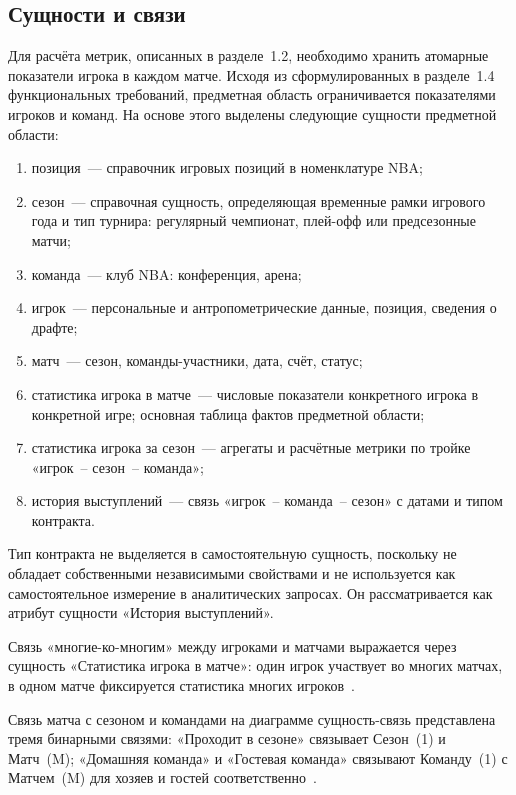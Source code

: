 \subsection{Сущности и связи}

Для расчёта метрик, описанных в разделе~1.2, необходимо хранить атомарные
показатели игрока в каждом матче. Исходя из сформулированных в разделе~1.4
функциональных требований, предметная область ограничивается
показателями игроков и команд. На основе этого выделены следующие сущности
предметной области:
\begin{enumerate}
    \item позиция~--- справочник игровых позиций в номенклатуре NBA;
    \item сезон~--- справочная сущность, определяющая временные рамки игрового
          года и тип турнира: регулярный чемпионат, плей-офф или предсезонные
          матчи;
    \item команда~--- клуб NBA: конференция, арена;
    \item игрок~--- персональные и антропометрические данные, позиция,
          сведения о драфте;
    \item матч~--- сезон, команды-участники, дата, счёт, статус;
    \item статистика игрока в матче~--- числовые показатели конкретного
          игрока в конкретной игре; основная таблица фактов предметной области;
    \item статистика игрока за сезон~--- агрегаты и расчётные метрики
          по тройке «игрок~-- сезон~-- команда»;
    \item история выступлений~--- связь «игрок~-- команда~-- сезон»
          с датами и типом контракта.
\end{enumerate}

Тип контракта не выделяется в самостоятельную сущность, поскольку
не обладает собственными независимыми свойствами и не используется
как самостоятельное измерение в аналитических запросах. Он рассматривается
как атрибут сущности «История выступлений».

Связь «многие-ко-многим» между игроками и матчами выражается через сущность
«Статистика игрока в матче»: один игрок участвует во многих матчах, в одном
матче фиксируется статистика многих игроков~\cite{connolly}\cite{chen}.

Связь матча с сезоном и командами на диаграмме сущность-связь представлена тремя
бинарными связями: «Проходит в сезоне» связывает Сезон~(1) и Матч~(M);
«Домашняя команда» и «Гостевая команда» связывают Команду~(1) с Матчем~(M)
для хозяев и гостей соответственно~\cite{chen}.

